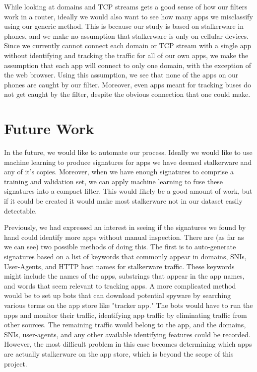 \documentclass[acmtog]{acmart}
\begin{document}
While looking at domains and TCP streams gets a good sense of how our filters work in a router, ideally we would also want to see how many apps we misclassify using our generic method. This is because our study is based on stalkerware in phones, and we make no assumption that stalkerware is only on cellular devices. Since we currently cannot connect each domain or TCP stream with a single app without identifying and tracking the traffic for all of our own apps, we make the assumption that each app will connect to only one domain, with the exception of the web browser. Using this assumption, we see that none of the apps on our phones are caught by our filter. Moreover, even apps meant for tracking buses do not get caught by the filter, despite the obvious connection that one could make. 





\section{Future Work}

In the future, we would like to automate our process. Ideally we would like to use machine learning to produce signatures for apps we have deemed stalkerware and any of it's copies. Moreover, when we have enough signatures to comprise a training and validation set, we can apply machine learning to fuse these signatures into a compact filter. This would likely be a good amount of work, but if it could be created it would make most stalkerware not in our dataset easily detectable.

Previously, we had expressed an interest in seeing if the signatures we found 
by hand could identify more apps without manual inspection. There are (as far 
as we can see) two possible methods of doing this. The first is to 
auto-generate signatures based on a list of keywords that commonly appear in 
domains, SNIs, User-Agents, and HTTP host names for stalkerware traffic. These 
keywords might include the names of the apps, substrings that appear in the app 
names, and words that seem relevant to tracking apps. A more complicated method 
would be to set up bots that can download potential spyware by searching 
various terms on the app store like "tracker app." The bots would have to run 
the apps and monitor their traffic, identifying app traffic by eliminating 
traffic from other sources. The remaining traffic would belong to the app, and 
the domains, SNIs, user-agents, and any other available identifying features 
could be recorded. However, the most difficult problem in this case becomes 
determining which apps are actually stalkerware on the app store, which is 
beyond the scope of this project. 
\end{document}
